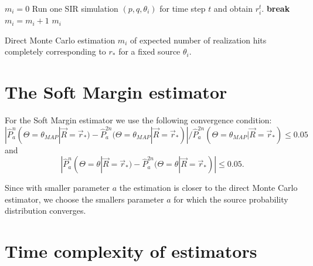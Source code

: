 \documentclass[times, utf8, diplomski]{fer}
\begin{document}
\begin{algorithm}[H]
 $m_i = 0$\; 
  {
    {
    Run one SIR simulation $(p, q, \theta_i)$ for time step $t$ and obtain  
    $r_i^t$.\; 
     {
   \textbf{break}\;
    }
   }
     {
  $m_i = m_i + 1$\;
 }
 }
  \Return $m_i$
  \vspace{5mm}
 \label{DMC_lag}
 \caption{Direct Monte Carlo estimation $m_i$ of expected number of realization hits completely corresponding to $r_*$  for a fixed source $\theta_i$.}
\end{algorithm}

\section{The Soft Margin estimator}

For the Soft Margin estimator we use the following convergence condition: 
\begin{equation*}
|\hat{P}_a^{n}(\Theta = \theta_{MAP} | \vec{R} = \vec{r}_*) - \hat{P}_a^{2n}(\Theta = \theta_{MAP} | \vec{R} = \vec{r}_*)| / \hat{P}_a^{2n}(\Theta = \theta_{MAP} | \vec{R} = \vec{r}_*) \leq 0.05 
\end{equation*}
and
\begin{equation*}
|\hat{P}_a^{n}(\Theta = \theta | \vec{R} = \vec{r}_*) - \hat{P}_a^{2n}(\Theta = \theta | \vec{R} = \vec{r}_*)| \leq 0.05.
\end{equation*}

Since with smaller parameter $a$ the estimation is closer to the direct Monte Carlo estimator, we choose the  smallers parameter $a$ for which the source probability distribution converges. 

\section{Time complexity of estimators}
 
\end{document}
